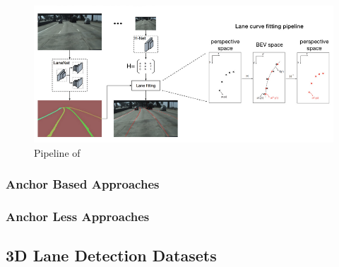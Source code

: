         
 \begin{figure}[h]
    \centering
    \includegraphics[width=\textwidth]{images/lanenet.png}
    \caption{Pipeline of \cite{DBLP:journals/corr/abs-1802-05591}}
    \end{figure}


\subsubsection{Anchor Based Approaches}
\subsubsection{Anchor Less Approaches}
\subsection{3D Lane Detection Datasets}

